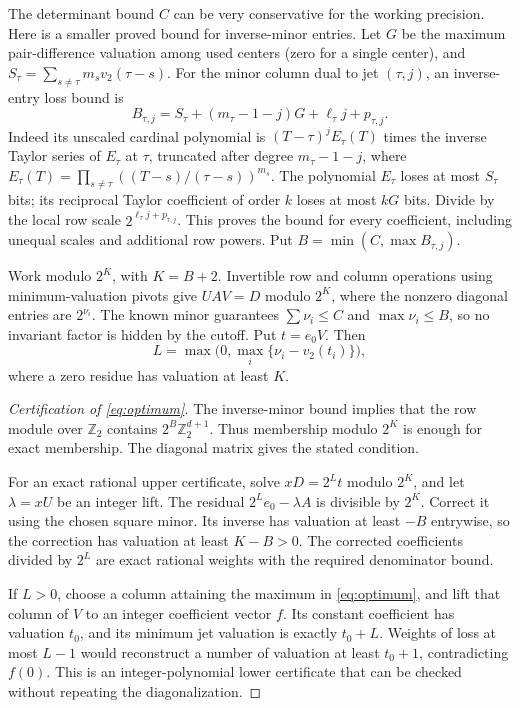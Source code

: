 \documentclass[11pt]{article}
\begin{document}
The determinant bound $C$ can be very conservative for the working
precision. Here is a smaller proved bound for inverse-minor entries.
Let $G$ be the maximum pair-difference valuation among used centers
(zero for a single center), and
$S_\tau=\sum_{s\ne\tau}m_s v_2(\tau-s)$.
For the minor column dual to jet $(\tau,j)$, an inverse-entry loss bound is
\[
 B_{\tau,j}=S_\tau+(m_\tau-1-j)G+\ell_\tau j+p_{\tau,j}.
\]
Indeed its unscaled cardinal polynomial is
$(T-\tau)^j E_\tau(T)$ times the inverse Taylor series of $E_\tau$
at $\tau$, truncated after degree $m_\tau-1-j$, where
$E_\tau(T)=\prod_{s\ne\tau}((T-s)/(\tau-s))^{m_s}$.
The polynomial $E_\tau$ loses at most $S_\tau$ bits; its reciprocal
Taylor coefficient of order $k$ loses at most $kG$ bits. Divide by
the local row scale $2^{\ell_\tau j+p_{\tau,j}}$.
This proves the bound for every coefficient, including unequal scales
and additional row powers. Put $B=\min(C,\max B_{\tau,j})$.

Work modulo $2^K$, with $K=B+2$. Invertible row and column operations
using minimum-valuation pivots give $UAV=D$ modulo $2^K$, where the
nonzero diagonal entries are $2^{\nu_i}$. The known minor guarantees
$\sum\nu_i\le C$ and $\max\nu_i\le B$, so no invariant factor is
hidden by the cutoff.
Put $t=e_0V$. Then
\begin{equation}
 L=\max\bigl(0,\max_i\{\nu_i-v_2(t_i)\}\bigr),
 \label{eq:optimum}
\end{equation}
where a zero residue has valuation at least $K$.

\begin{proof}[Certification of \eqref{eq:optimum}]
The inverse-minor bound implies that the row module over $\mathbb Z_2$
contains $2^B\mathbb Z_2^{d+1}$. Thus membership modulo $2^K$ is enough
for exact membership. The diagonal matrix gives the stated condition.

For an exact rational upper certificate, solve
$xD=2^Lt$ modulo $2^K$, and let $\lambda=xU$ be an integer lift.
The residual $2^Le_0-\lambda A$ is divisible by $2^K$.
Correct it using the chosen square minor. Its inverse has valuation
at least $-B$ entrywise, so the correction has valuation at least
$K-B>0$. The corrected coefficients divided by $2^L$ are exact
rational weights with the required denominator bound.

If $L>0$, choose a column attaining the maximum in
\eqref{eq:optimum}, and lift that column of $V$ to an integer
coefficient vector $f$. Its constant coefficient has valuation $t_0$,
and its minimum jet valuation is exactly $t_0+L$. Weights of loss at
most $L-1$ would reconstruct a number of valuation at least $t_0+1$,
contradicting $f(0)$. This is an integer-polynomial lower certificate
that can be checked without repeating the diagonalization.
\end{proof}
\end{document}
